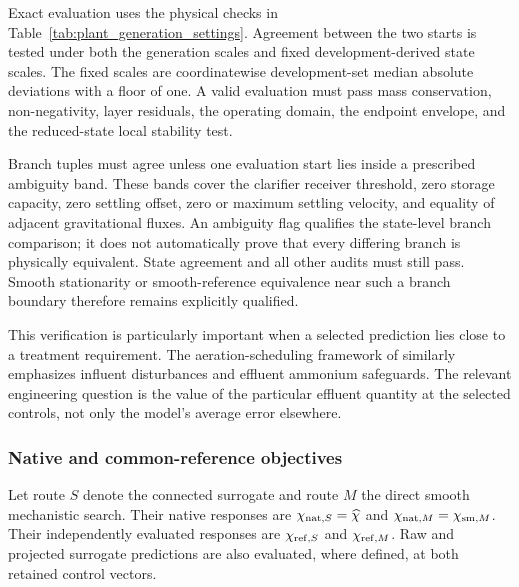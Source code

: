 Exact evaluation uses the physical checks in Table~\ref{tab:plant_generation_settings}. Agreement between the two starts is tested under both the generation scales and fixed development-derived state scales. The fixed scales are coordinatewise development-set median absolute deviations with a floor of one. A valid evaluation must pass mass conservation, non-negativity, layer residuals, the operating domain, the endpoint envelope, and the reduced-state local stability test.

Branch tuples must agree unless one evaluation start lies inside a prescribed ambiguity band. These bands cover the clarifier receiver threshold, zero storage capacity, zero settling offset, zero or maximum settling velocity, and equality of adjacent gravitational fluxes. An ambiguity flag qualifies the state-level branch comparison; it does not automatically prove that every differing branch is physically equivalent. State agreement and all other audits must still pass. Smooth stationarity or smooth-reference equivalence near such a branch boundary therefore remains explicitly qualified.

This verification is particularly important when a selected prediction lies close to a treatment requirement. The aeration-scheduling framework of \citet{Ren2026} similarly emphasizes influent disturbances and effluent ammonium safeguards. The relevant engineering question is the value of the particular effluent quantity at the selected controls, not only the model's average error elsewhere.

\subsubsection{Native and common-reference objectives}

Let route $S$ denote the connected surrogate and route $M$ the direct smooth mechanistic search. Their native responses are $\chi_{{\rm nat},S}=\widehat\chi$ and $\chi_{{\rm nat},M}=\chi_{{\rm sm},M}$. Their independently evaluated responses are $\chi_{{\rm ref},S}$ and $\chi_{{\rm ref},M}$. Raw and projected surrogate predictions are also evaluated, where defined, at both retained control vectors.


